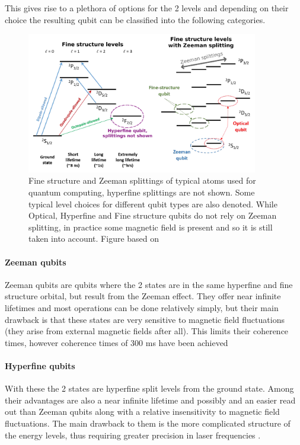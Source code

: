 This gives rise to a plethora of options for the 2 levels and depending on their choice the resulting qubit can be classified into the following categories.


\begin{figure}[H]
    \centering
    \includegraphics[width=0.9\textwidth]{images/TIQC_levels.jpg}
    \caption{Fine structure and Zeeman splittings of typical atoms used for quantum computing, hyperfine splittings are not shown.
    Some typical level choices for different qubit types are also denoted.
    While Optical, Hyperfine and Fine structure qubits do not rely on Zeeman splitting, in practice some magnetic field is present and so it is still taken into account.
    Figure based on \cite{bruzewiczTrappedionQuantumComputing2019}}\label{fig:TIQC_levels}
\end{figure}

\paragraph{Zeeman qubits}
Zeeman qubits are qubits where the 2 states are in the same hyperfine and fine structure orbital, but result from the Zeeman effect.
They offer near infinite lifetimes and most operations can be done relatively simply, but their main drawback is that these states are very sensitive to magnetic field fluctuations (they arise from external magnetic fields after all).
This limits their coherence times, however coherence times of 300 ms have been achieved \cite{rusterLonglivedZeemanTrappedion2016}

\paragraph{Hyperfine qubits}
With these the 2 states are hyperfine split levels from the ground state.
Among their advantages are also a near infinite lifetime and possibly and an easier read out than Zeeman qubits along with a relative insensitivity to magnetic field fluctuations.
The main drawback to them is the more complicated structure of the energy levels, thus requiring greater precision in laser frequencies \cite{bruzewiczTrappedionQuantumComputing2019}.

